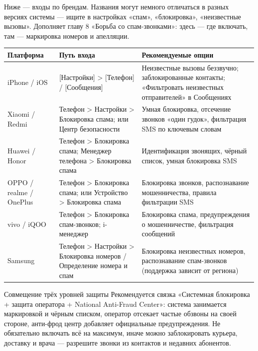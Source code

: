 
Ниже — входы по брендам. Названия могут немного отличаться в разных версиях системы — ищите в настройках «спам», «блокировка», «неизвестные вызовы». Дополняет главу 8 «Борьба со спам-звонками»: здесь — где включать, там — маркировка номеров и апелляции.

\begin{center}
\begin{tabularx}{\linewidth}{|X|X|X|}
\hline
\textbf{Платформа} & \textbf{Путь входа} & \textbf{Рекомендуемые опции} \tabularnewline
\hline
iPhone / iOS & {}[Настройки] > [Телефон] / [Сообщения] & Неизвестные вызовы беззвучно; заблокированные контакты; «Фильтровать неизвестных отправителей» в Сообщениях \tabularnewline
Xiaomi / Redmi & Телефон > Настройки > Блокировка спама; или Центр безопасности & Умная блокировка, отсечение звонков «один гудок», фильтрация SMS по ключевым словам \tabularnewline
Huawei / Honor & Телефон > Блокировка спама; Менеджер телефона > Блокировка спама & Идентификация звонящих, чёрный список, умная блокировка SMS \tabularnewline
OPPO / realme / OnePlus & Телефон > Блокировка спама; или Устройство > Блокировка спама & Блокировка звонков, распознавание мошенничества, правила фильтрации SMS \tabularnewline
vivo / iQOO & Телефон > Блокировка спам-звонков; i-менеджер & Блокировка спама, предупреждения о мошенничестве, фильтрация сообщений \tabularnewline
Samsung & Телефон > Настройки > Блокировка номеров / Определение номера и спам & Блокировка неизвестных номеров, распознавание спам-звонков (поддержка зависит от региона) \tabularnewline
\hline
\end{tabularx}
\end{center}

\begin{tcbinfo}{Совмещение трёх уровней защиты}
Рекомендуется связка «Системная блокировка + защита оператора + National Anti-Fraud Center»: система занимается маркировкой и чёрным списком, оператор отсекает частые обзвоны на своей стороне, анти-фрод центр добавляет официальные предупреждения. Не обязательно включать всё на максимум, иначе можно заблокировать курьера, доставку и врача — разрешите звонки из контактов и недавних абонентов.

\end{tcbinfo}

